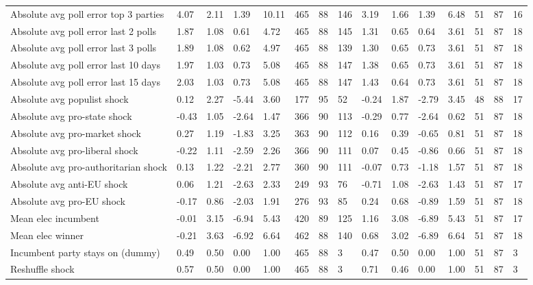 \begin{longtable}{lllllllllllllll}
Absolute avg poll error top 3 parties & 4.07 & 2.11 & 1.39 & 10.11 & 465 & 88 & 146 & 3.19 & 1.66 & 1.39 & 6.48 & 51 & 87 & 16\\
Absolute avg poll error last 2 polls & 1.87 & 1.08 & 0.61 & 4.72 & 465 & 88 & 145 & 1.31 & 0.65 & 0.64 & 3.61 & 51 & 87 & 18\\
\addlinespace
Absolute avg poll error last 3 polls & 1.89 & 1.08 & 0.62 & 4.97 & 465 & 88 & 139 & 1.30 & 0.65 & 0.73 & 3.61 & 51 & 87 & 18\\
Absolute avg poll error last 10 days & 1.97 & 1.03 & 0.73 & 5.08 & 465 & 88 & 147 & 1.38 & 0.65 & 0.73 & 3.61 & 51 & 87 & 18\\
Absolute avg poll error last 15 days & 2.03 & 1.03 & 0.73 & 5.08 & 465 & 88 & 147 & 1.43 & 0.64 & 0.73 & 3.61 & 51 & 87 & 18\\
Absolute avg populist shock & 0.12 & 2.27 & -5.44 & 3.60 & 177 & 95 & 52 & -0.24 & 1.87 & -2.79 & 3.45 & 48 & 88 & 17\\
Absolute avg pro-state shock & -0.43 & 1.05 & -2.64 & 1.47 & 366 & 90 & 113 & -0.29 & 0.77 & -2.64 & 0.62 & 51 & 87 & 18\\
\addlinespace
Absolute avg pro-market shock & 0.27 & 1.19 & -1.83 & 3.25 & 363 & 90 & 112 & 0.16 & 0.39 & -0.65 & 0.81 & 51 & 87 & 18\\
Absolute avg pro-liberal shock & -0.22 & 1.11 & -2.59 & 2.26 & 366 & 90 & 111 & 0.07 & 0.45 & -0.86 & 0.66 & 51 & 87 & 18\\
Absolute avg pro-authoritarian shock & 0.13 & 1.22 & -2.21 & 2.77 & 360 & 90 & 111 & -0.07 & 0.73 & -1.18 & 1.57 & 51 & 87 & 18\\
Absolute avg anti-EU shock & 0.06 & 1.21 & -2.63 & 2.33 & 249 & 93 & 76 & -0.71 & 1.08 & -2.63 & 1.43 & 51 & 87 & 17\\
Absolute avg pro-EU shock & -0.17 & 0.86 & -2.03 & 1.91 & 276 & 93 & 85 & 0.24 & 0.68 & -0.89 & 1.59 & 51 & 87 & 18\\
\addlinespace
Mean elec incumbent & -0.01 & 3.15 & -6.94 & 5.43 & 420 & 89 & 125 & 1.16 & 3.08 & -6.89 & 5.43 & 51 & 87 & 17\\
Mean elec winner & -0.21 & 3.63 & -6.92 & 6.64 & 462 & 88 & 140 & 0.68 & 3.02 & -6.89 & 6.64 & 51 & 87 & 18\\
Incumbent party stays on (dummy) & 0.49 & 0.50 & 0.00 & 1.00 & 465 & 88 & 3 & 0.47 & 0.50 & 0.00 & 1.00 & 51 & 87 & 3\\
Reshuffle shock & 0.57 & 0.50 & 0.00 & 1.00 & 465 & 88 & 3 & 0.71 & 0.46 & 0.00 & 1.00 & 51 & 87 & 3\\

\end{longtable}
